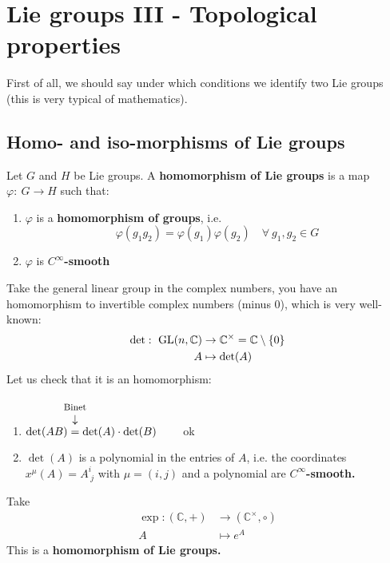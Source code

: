 \documentclass[../main.tex]{subfiles}
\begin{document}
\setchapterpreamble[u]{\margintoc}
\chapter[Lie groups III - Topological properties]{Lie groups III - Topological properties\footnotemark[0]}
First of all, we should say under which conditions we identify two Lie groups (this is very typical of mathematics).
\section{Homo- and iso-morphisms of Lie groups}
\begin{definition}
Let $G$ and $H$ be Lie groups. A \textbf{homomorphism of Lie groups} is a map $\varphi: \ G\to H$ such that:
\begin{enumerate}
    \item $\varphi$ is a \textbf{homomorphism of groups}, i.e.
    \[
    \varphi(g_1g_2)=\varphi(g_1)\varphi(g_2) \quad \forall \ g_1,g_2 \in G
    \]
    \item $\varphi$ is $C^\infty$\textbf{-smooth}
\end{enumerate}
\end{definition}
\begin{example}
Take the general linear group in the complex numbers, you have an homomorphism to invertible complex numbers (minus 0), which is very well-known:
\[
\begin{split}
    \det: \ \textrm{GL}(n,\mathbb{C}) &\to \mathbb{C}^\times = \mathbb{C}\setminus \Bqty{0}\\
    A & \mapsto \det (A)
\end{split}
\]
Let us check that it is an homomorphism:
\begin{enumerate}
    \item $\det(AB)\overset{\mathclap{\tikz \node {$\downarrow$} node [above=1.25ex] {\footnotesize Binet};}}{=}\det(A)\cdot\det(B) \quad \quad$ ok \checkmark
    \item $\det(A)$ is a polynomial in the entries of $A$, i.e. the coordinates $x^\mu (A)=A^i_{\; j}$ with $\mu = (i,j)$ and a polynomial are $C^\infty$\textbf{-smooth.}
\end{enumerate}
\end{example}
\begin{example}
Take
\[
\begin{split}
\exp: \left(\mathbb{C}, + \right) &\to \left(\mathbb{C}^\times, \circ \right)\\
A & \mapsto e^A
\end{split}
\]
This is a \textbf{homomorphism of Lie groups.}
\end{example}
\end{document}
